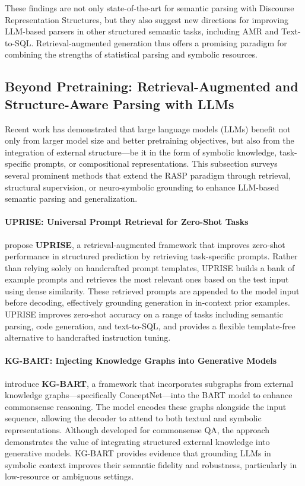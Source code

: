 These findings are not only state-of-the-art for semantic parsing with Discourse Representation Structures, but they also suggest new directions for improving LLM-based parsers in other structured semantic tasks, including AMR and Text-to-SQL. Retrieval-augmented generation thus offers a promising paradigm for combining the strengths of statistical parsing and symbolic resources.

\subsection{Beyond Pretraining: Retrieval-Augmented and Structure-Aware Parsing with LLMs}

Recent work has demonstrated that large language models (LLMs) benefit not only from larger model size and better pretraining objectives, but also from the integration of external structure—be it in the form of symbolic knowledge, task-specific prompts, or compositional representations. This subsection surveys several prominent methods that extend the RASP paradigm through retrieval, structural supervision, or neuro-symbolic grounding to enhance LLM-based semantic parsing and generalization.

\paragraph{UPRISE: Universal Prompt Retrieval for Zero-Shot Tasks}

\citet{cheng2023uprise} propose \textbf{UPRISE}, a retrieval-augmented framework that improves zero-shot performance in structured prediction by retrieving task-specific prompts. Rather than relying solely on handcrafted prompt templates, UPRISE builds a bank of example prompts and retrieves the most relevant ones based on the test input using dense similarity. These retrieved prompts are appended to the model input before decoding, effectively grounding generation in in-context prior examples. UPRISE improves zero-shot accuracy on a range of tasks including semantic parsing, code generation, and text-to-SQL, and provides a flexible template-free alternative to handcrafted instruction tuning.

\paragraph{KG-BART: Injecting Knowledge Graphs into Generative Models}

\citet{liu2021kgbart} introduce \textbf{KG-BART}, a framework that incorporates subgraphs from external knowledge graphs—specifically ConceptNet—into the BART model to enhance commonsense reasoning. The model encodes these graphs alongside the input sequence, allowing the decoder to attend to both textual and symbolic representations. Although developed for commonsense QA, the approach demonstrates the value of integrating structured external knowledge into generative models. KG-BART provides evidence that grounding LLMs in symbolic context improves their semantic fidelity and robustness, particularly in low-resource or ambiguous settings.

